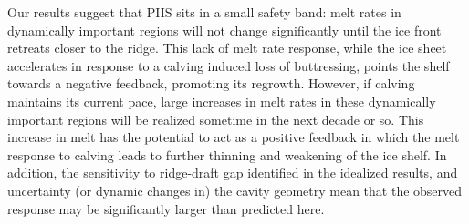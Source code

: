\documentclass[draft]{agujournal2019}
\begin{document}
Our results suggest that PIIS sits in a small safety band: melt rates in dynamically important regions will not change significantly until the ice front retreats closer to the ridge. This lack of melt rate response, while the ice sheet accelerates in response to a calving induced loss of buttressing, points the shelf towards a negative feedback, promoting its regrowth. However, if calving maintains its current pace, large increases in melt rates in these dynamically important regions will be realized sometime in the next decade or so. This increase in melt has the potential to act as a positive feedback in which the melt response to calving leads to further thinning and weakening of the ice shelf. In addition, the sensitivity to ridge-draft gap identified in the idealized results, and uncertainty (or dynamic changes in) the cavity geometry mean that the observed response may be significantly larger than predicted here.



%
\end{document}
